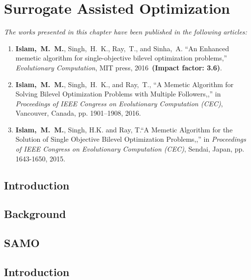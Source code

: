 \chapter{Surrogate Assisted Optimization}
\label{chapter:3}

\begin{tcolorbox}
\textit{The works presented in this chapter have been published in the following articles:}
\begin{enumerate}
\small
\item \textbf{Islam,~M.~M.}, {Singh,~H.~K.},  {Ray,~T.}, and {Sinha,~A.} ``An Enhanced memetic algorithm for single-objective bilevel optimization problems,'' {\em Evolutionary Computation}, MIT press, 2016~\textbf{(Impact factor: 3.6)}.
\item \textbf{Islam,~M.~M.}, {Singh,~H.~K.}, and {Ray,~T.}, ``A Memetic Algorithm for Solving Bilevel Optimization Problems with Multiple Followers,,'' in {\em Proceedings of IEEE Congress on Evolutionary Computation (CEC)}, Vancouver, Canada, pp. 1901--1908, 2016.
\item  \textbf{Islam,~M.~M.}, {Singh, H.K.} and {Ray, T.}``A Memetic Algorithm for the Solution of Single Objective Bilevel Optimization Problems,,'' in {\em Proceedings of IEEE Congress on Evolutionary Computation (CEC)}, Sendai, Japan, pp. 1643-1650, 2015.

\end{enumerate}

\end{tcolorbox}


\section{Introduction}
\label{sec:intro}






\section{Background}
\label{sec:back}

\section{SAMO}

\section{Introduction}

